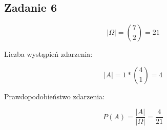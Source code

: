 \subsection{Zadanie 6}

$$ |\Omega|= \binom{7}{2}=21 $$

Liczba wystąpień zdarzenia:

$$ |A| = 1* \binom{4}{1}=4 $$

Prawdopodobieństwo zdarzenia:

$$ P(A)=\frac{|A|}{|\Omega|}=\frac{4}{21} $$

